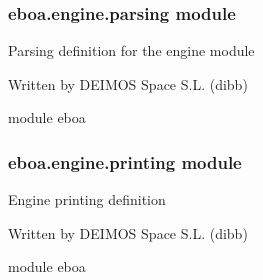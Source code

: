 \subsubsection{eboa.engine.parsing module}
\label{\detokenize{eboa.engine:module-eboa.engine.parsing}}\label{\detokenize{eboa.engine:eboa-engine-parsing-module}}
Parsing definition for the engine module

Written by DEIMOS Space S.L. (dibb)

module eboa

\begin{fulllineitems}
\label{\detokenize{eboa.engine:eboa.engine.parsing.validate_data_dictionary}}
\end{fulllineitems}



\subsubsection{eboa.engine.printing module}
\label{\detokenize{eboa.engine:module-eboa.engine.printing}}\label{\detokenize{eboa.engine:eboa-engine-printing-module}}
Engine printing definition

Written by DEIMOS Space S.L. (dibb)

module eboa

